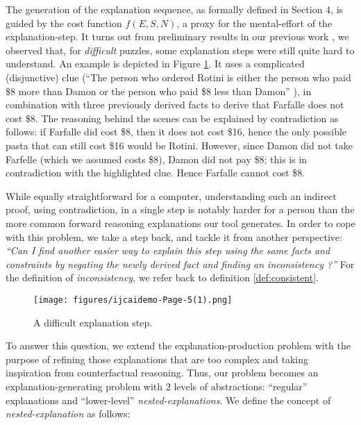 The generation of the explanation sequence, as formally defined in Section 4, is guided by the cost function $f(E, S, N)$, a proxy for the mental-effort of the explanation-step. 
It turns out from preliminary results in our previous work \cite{ecai/BogaertsGCG20}, we observed that, for \textit{difficult} puzzles, some explanation steps were still quite hard to understand. An example is depicted in Figure \ref{fig:pasta_diff}.
It uses a complicated (disjunctive) clue (``The person who ordered Rotini is either the person who paid \$8 more than Damon or the person who paid \$8 less than Damon'' ), in combination with three previously derived facts to derive that Farfalle does not cost \$8. 
The reasoning behind the scenes can be explained by contradiction as follows: if Farfalle did cost \$8, then it does not cost \$16, hence the only possible pasta that can still cost \$16 would be Rotini.  However, since Damon did not take Farfelle (which we assumed costs \$8), Damon did not pay \$8; this is in contradiction with the highlighted clue. Hence Farfalle cannot cost \$8. 

While equally straightforward for a computer, understanding such an indirect proof, using contradiction, in a single step is notably harder for a person than the more common forward reasoning explanations our tool generates. 
In order to cope with this problem, we take a step back, and tackle it from another perspective: \textit{``Can I find another easier way to explain this step using the same facts and constraints by negating the newly derived fact and finding an inconsistency ?''} For the definition of \textit{inconsistency}, we refer back to definition \ref{def:consistent}.


\begin{figure}[H]
    \texttt{[image: figures/ijcaidemo-Page-5(1).png]}
    \caption{A difficult explanation step.}\label{fig:pasta_diff}
    \end{figure}

To answer this question, we extend the explanation-production problem with the purpose of refining those explanations that are too complex and taking inspiration from counterfactual reasoning. 
Thus, our problem becomes an explanation-generating problem with 2 levels of abstractions: ``regular'' explanations and ``lower-level'' \textit{nested-explanations}. 
We define the concept of \emph{nested-explanation} as follows:

